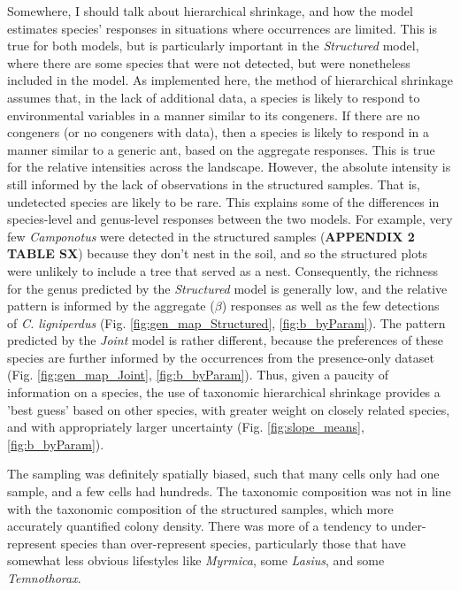 \documentclass[preprint,review,times,12pt,3p]{elsarticle}
\begin{document}
Somewhere, I should talk about hierarchical shrinkage, and how the model estimates species' responses in situations where occurrences are limited. This is true for both models, but is particularly important in the \emph{Structured} model, where there are some species that were not detected, but were nonetheless included in the model. As implemented here, the method of hierarchical shrinkage assumes that, in the lack of additional data, a species is likely to respond to environmental variables in a manner similar to its congeners. If there are no congeners (or no congeners with data), then a species is likely to respond in a manner similar to a generic ant, based on the aggregate responses. This is true for the relative intensities across the landscape. However, the absolute intensity is still informed by the lack of observations in the structured samples. That is, undetected species are likely to be rare. This explains some of the differences in species-level and genus-level responses between the two models. For example, very few \emph{Camponotus} were detected in the structured samples (\textbf{APPENDIX 2 TABLE SX}) because they don't nest in the soil, and so the structured plots were unlikely to include a tree that served as a nest. Consequently, the richness for the genus predicted by the \emph{Structured} model is generally low, and the relative pattern is informed by the aggregate ($\beta$) responses as well as the few detections of \emph{C. ligniperdus} (Fig. \ref{fig:gen_map_Structured}, \ref{fig:b_byParam}). The pattern predicted by the \emph{Joint} model is rather different, because the preferences of these species are further informed by the occurrences from the presence-only dataset (Fig. \ref{fig:gen_map_Joint}, \ref{fig:b_byParam}). Thus, given a paucity of information on a species, the use of taxonomic hierarchical shrinkage provides a 'best guess' based on other species, with greater weight on closely related species, and with appropriately larger uncertainty (Fig. \ref{fig:slope_means}, \ref{fig:b_byParam}).

The sampling was definitely spatially biased, such that many cells only had one sample, and a few cells had hundreds. The taxonomic composition was not in line with the taxonomic composition of the structured samples, which more accurately quantified colony density. There was more of a tendency to under-represent species than over-represent species, particularly those that have somewhat less obvious lifestyles like \emph{Myrmica}, some \emph{Lasius}, and some \emph{Temnothorax}.  
\end{document}
